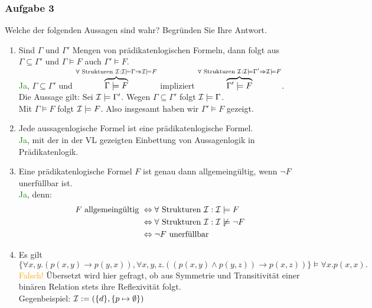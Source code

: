 \subsubsection*{Aufgabe 3}
Welche der folgenden Aussagen sind wahr? Begründen Sie Ihre Antwort.
\begin{enumerate}
\item Sind $\Gamma$ und $\Gamma'$ Mengen von prädikatenlogischen Formeln, dann folgt aus $\Gamma \subseteq \Gamma'$ und $\Gamma \models F$ auch $\Gamma' \models F$. \\
\LOES \textcolor{green}{Ja}, $\Gamma \subseteq \Gamma'$ und $\overbrace{\Gamma \models F}^{\forall \text{ Strukturen } \mathcal{I}: \mathcal{I} \models \Gamma \Rightarrow \mathcal{I} \models F}$  impliziert $\overbrace{\Gamma' \models F}^{\forall \text{ Strukturen } \mathcal{I}: \mathcal{I} \models \Gamma' \Rightarrow \mathcal{I} \models F}$. \\
Die Aussage gilt: Sei $\mathcal{I} \models \Gamma'$. Wegen $\Gamma \subseteq \Gamma'$ folgt $\mathcal{I} \models \Gamma$. \\
Mit $\Gamma \models F$ folgt $\mathcal{I} \models F$. Also insgesamt haben wir $\Gamma' \models F$ gezeigt.
\item Jede aussagenlogische Formel ist eine prädikatenlogische Formel. \\
\LOES \textcolor{green}{Ja}, mit der in der VL gezeigten Einbettung von Aussagenlogik in Prädikatenlogik.
\item Eine prädikatenlogische Formel $F$ ist genau dann allgemeingültig, wenn $\neg F$ unerfüllbar ist. \\
\LOES \textcolor{green}{Ja}, denn: 
\begin{align*}
F \text{ allgemeingültig } &\Leftrightarrow \forall \text{ Strukturen } \mathcal{I}:\mathcal{I} \models F \\
& \Leftrightarrow \forall \text{ Strukturen } \mathcal{I}: \mathcal{I} \not\models \neg F \\
& \Leftrightarrow \neg F \text{ unerfüllbar }
\end{align*}
\item Es gilt 
\begin{equation*}
\{\forall x,y.(p(x,y) \to p(y,x)), \forall x,y,z.((p(x,y) \land p(y,z)) \to p(x,z))\} \models \forall x.p(x,x).
\end{equation*}
\LOES \textcolor{orange}{Falsch!} Übersetzt wird hier gefragt, ob aus Symmetrie und Transitivität einer binären Relation stets ihre Reflexivität folgt. \\
Gegenbeispiel: $\mathcal{I} := (\{d\},\{p \mapsto \emptyset \})$
\end{enumerate}
